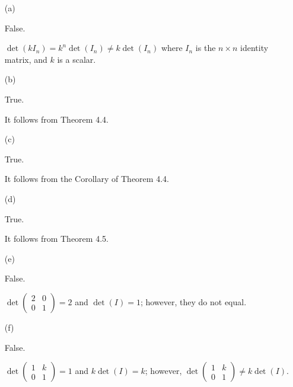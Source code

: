 \begin{Exercise}
	\begin{enumerate}[(a)]
		\item[(a)]
		\begin{answer}
			False.
		\end{answer}
		\begin{solution}
			$\det(k I_n) = k^n\det(I_n) \neq k\det(I_n)$ where $I_n$ is the $n\times n$ identity matrix, and $k$ is a scalar.
		\end{solution}
		
		\item[(b)]
		\begin{answer}
			True.
		\end{answer}
		\begin{solution}
			It follows from Theorem 4.4.
		\end{solution}
		
		\item[(c)]
		\begin{answer}
			True.
		\end{answer}
		\begin{solution}
			It follows from the Corollary of Theorem 4.4.
		\end{solution}
		
		\item[(d)]
		\begin{answer}
			True.
		\end{answer}
		\begin{solution}
			It follows from Theorem 4.5.
		\end{solution}
		
		\item[(e)]
		\begin{answer}
			False.
		\end{answer}
		\begin{solution}
			$\det\begin{pmatrix}
			2 & 0 \\
			0 & 1
			\end{pmatrix} = 2$ and $\det(I) = 1$; however, they do not equal.
		\end{solution}
		
		\item[(f)]
		\begin{answer}
			False.
		\end{answer}
		\begin{solution}
			$\det\begin{pmatrix}
			1 & k \\
			0 & 1
			\end{pmatrix} = 1$ and $k\det(I) = k$; however, $\det\begin{pmatrix}
			1 & k \\
			0 & 1
			\end{pmatrix} \neq k\det(I)$.
		\end{solution}
		

\end{enumerate}
\end{Exercise}
